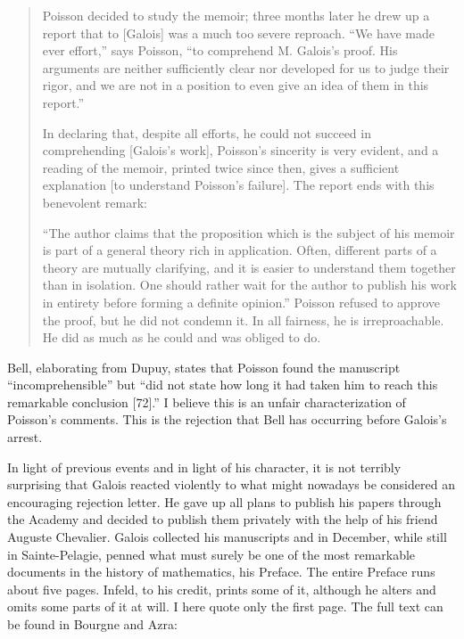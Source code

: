 \documentclass[12pt]{article}
\begin{document}
\begin{quotation}
Poisson decided to study the memoir; three months later he drew up a report that to [Galois] was a much too severe reproach. ``We have made ever effort,'' says Poisson, ``to comprehend M. Galois's proof. His arguments are neither sufficiently clear nor developed for us to judge their rigor, and we are not in a position to even give an idea of them in this report.''

In declaring that, despite all efforts, he could not succeed in comprehending [Galois's work], Poisson's sincerity is very evident, and a reading of the memoir, printed twice since then, gives a sufficient explanation [to understand Poisson's failure]. The report ends with this benevolent remark:

``The author claims that the proposition which is the subject of his memoir is part of a general theory rich in application. Often, different parts of a theory are mutually clarifying, and it is easier to understand them together than in isolation. One should rather wait for the author to publish his work in entirety before forming a definite opinion.'' Poisson refused to approve the proof, but he did not condemn it. In all fairness, he is irreproachable. He did as much as he could and was obliged to do.
\end{quotation}

Bell, elaborating from Dupuy, states that Poisson found the manuscript ``incomprehensible'' but ``did not state how long it had taken him to reach this remarkable conclusion [72].'' I believe this is an unfair characterization of Poisson's comments. This is the rejection that Bell has occurring before Galois's arrest.

In light of previous events and in light of his character, it is not terribly surprising that Galois reacted violently to what might nowadays be considered an encouraging rejection letter. He gave up all plans to publish his papers through the Academy and decided to publish them privately with the help of his friend Auguste Chevalier. Galois collected his manuscripts and in December, while still in Sainte-Pelagie, penned what must surely be one of the most remarkable documents in the history of mathematics, his Preface. The entire Preface runs about five pages. Infeld, to his credit, prints some of it, although he alters and omits some parts of it at will. I here quote only the first page. The full text can be found in Bourgne and Azra:
\end{document}
